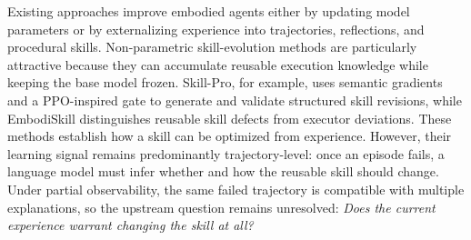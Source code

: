 
Existing approaches improve embodied agents either by updating model parameters or by externalizing experience into trajectories, reflections, and procedural skills. Non-parametric skill-evolution methods are particularly attractive because they can accumulate reusable execution knowledge while keeping the base model frozen. Skill-Pro, for example, uses semantic gradients and a PPO-inspired gate to generate and validate structured skill revisions, while EmbodiSkill distinguishes reusable skill defects from executor deviations. These methods establish how a skill can be optimized from experience. However, their learning signal remains predominantly trajectory-level: once an episode fails, a language model must infer whether and how the reusable skill should change. Under partial observability, the same failed trajectory is compatible with multiple explanations, so the upstream question remains unresolved: \emph{Does the current experience warrant changing the skill at all?}


